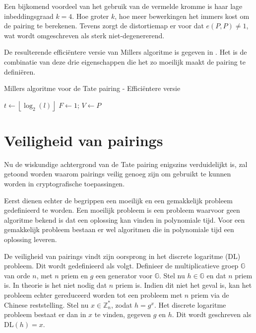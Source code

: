 Een bijkomend voordeel van het gebruik van de vermelde kromme is haar lage inbeddingsgraad $k = 4$. Hoe groter $k$, hoe meer bewerkingen het immers kost om de pairing te berekenen. Tevens zorgt de distortiemap er voor dat $e(P, P) \neq 1$, wat wordt omgeschreven als sterk niet-degenererend.

De resulterende effici\"entere versie van Millers algoritme is gegeven in .
Het is de combinatie van deze drie eigenschappen die het zo moeilijk maakt de pairing te defini\"eren.
\begin{algorithm}[h]
	\caption{Millers algoritme voor de Tate pairing - Effici\"entere versie}
	\label{algoritme-pairings-miller-beter}
	$t \gets \left\lfloor \log _2 (l) \right\rfloor$\;
	$F \gets 1$; $V \gets P$\;	
\end{algorithm}

\section{Veiligheid van pairings}

Nu de wiskundige achtergrond van de Tate pairing enigszins verduidelijkt is, zal getoond worden waarom pairings veilig genoeg zijn om gebruikt te kunnen worden in cryptografische toepassingen.

Eerst dienen echter de begrippen een moeilijk en een gemakkelijk probleem gedefinieerd te worden. Een moeilijk probleem is een probleem waarvoor geen algoritme bekend is dat een oplossing kan vinden in polynomiale tijd. Voor een gemakkelijk probleem bestaan er wel algoritmen die in polynomiale tijd een oplossing leveren.

De veiligheid van pairings vindt zijn oorsprong in het discrete logaritme (DL) probleem. Dit wordt gedefinieerd als volgt. Definieer de multiplicatieve groep $\mathbb{G}$ van orde $n$, met $n$ priem en $g$ een generator voor $\mathbb{G}$. Stel nu $h \in \mathbb{G}$ en dat $n$ priem is. In theorie is het niet nodig dat $n$ priem is. Indien dit niet het geval is, kan het probleem echter gereduceerd worden tot een probleem met $n$ priem via de Chinese reststelling. Stel nu $x \in \mathbb{Z}_n^*$, zodat $h = g^x$. Het discrete logaritme probleem bestaat er dan in $x$ te vinden, gegeven $g$ en $h$. Dit wordt geschreven als DL$(h) = x$.

